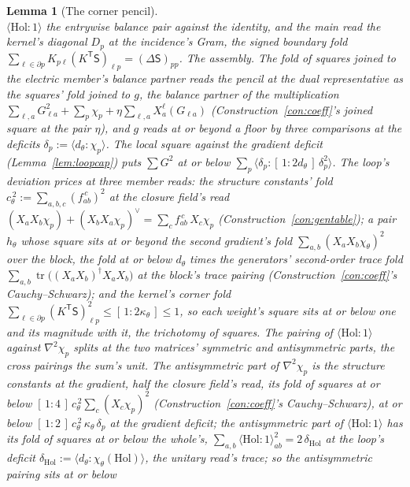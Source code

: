 \documentclass[11pt]{article}
\newtheorem{lemma}{Lemma}
\theoremstyle{definition}
\newcommand{\tr}{\operatorname{tr}}
\begin{document}
\begin{lemma}[The corner pencil]
\[\]
$\langle\mathrm{Hol}\!:\!1\rangle$ the entrywise balance pair
against the identity, and the main read the kernel's diagonal $D_p$
at the incidence's Gram, the signed boundary fold
$\sum_{\ell\in\partial p}K_{p\ell}(K^{\mathsf T}\mathsf S)_{\ell p}
=(\Delta\mathsf S)_{pp}$.
\emph{The assembly.} The fold of squares joined to the electric
member's balance partner reads the pencil at the dual
representative as the squares' fold joined to $g$, the
balance partner of the multiplication
$\sum_{\ell,a}G_{\ell a}^{2}+\sum_p\chi_p+\eta\sum_{\ell,a}X_a^{\ell}(G_{\ell a})$
(Construction~\ref{con:coeff}'s joined square at the pair $\eta$),
and $g$ reads at or beyond a floor by three comparisons at the
deficits $\delta_p:=\langle d_\theta\!:\!\chi_p\rangle$. The local
square against the gradient deficit (Lemma~\ref{lem:loopcap}) puts
$\sum G^{2}$ at or below
$\sum_p\big\langle\delta_p\!:\![\,1:2d_\theta\,]\,\delta_p^{2}\big\rangle$.
The loop's deviation prices at three member reads: the structure
constants' fold $c_\theta^{\,2}:=\sum_{a,b,c}(f_{ab}^{\,c})^{2}$ at
the closure field's read
$(X_aX_b\chi_p)+(X_bX_a\chi_p)^{\!\vee}=\sum_cf_{ab}^{\,c}\,X_c\chi_p$
(Construction~\ref{con:gentable}); a pair $h_\theta$ whose square
sits at or beyond the second gradient's fold
$\sum_{a,b}(X_aX_b\chi_\theta)^{2}$ over the block, the fold at or
below $d_\theta$ times the generators' second-order trace fold
$\sum_{a,b}\tr\big((X_aX_b)^{\dagger}X_aX_b\big)$ at the block's
trace pairing (Construction~\ref{con:coeff}'s Cauchy--Schwarz); and
the kernel's corner fold
$\sum_{\ell\in\partial p}(K^{\mathsf T}\mathsf S)_{\ell p}^{2}
\le[\,1:2\kappa_\theta\,]\le1$, so each weight's square sits at or
below one and its magnitude with it, the trichotomy of squares. The
pairing of $\langle\mathrm{Hol}\!:\!1\rangle$ against
$\nabla^{2}\chi_p$ splits at the two matrices' symmetric and
antisymmetric parts, the cross pairings the sum's unit. The
antisymmetric part of $\nabla^{2}\chi_p$ is the structure constants
at the gradient, half the closure field's read, its fold of squares
at or below $[\,1:4\,]\,c_\theta^{\,2}\sum_c(X_c\chi_p)^{2}$
(Construction~\ref{con:coeff}'s Cauchy--Schwarz), at or below
$[\,1:2\,]\,c_\theta^{\,2}\,\kappa_\theta\,\delta_p$ at the gradient
deficit; the antisymmetric part of $\langle\mathrm{Hol}\!:\!1\rangle$
has its fold of squares at or below the whole's,
$\sum_{a,b}\langle\mathrm{Hol}\!:\!1\rangle_{ab}^{2}=2\,\delta_{\mathrm{Hol}}$
at the loop's deficit $\delta_{\mathrm{Hol}}:=\langle
d_\theta\!:\!\chi_\theta(\mathrm{Hol})\rangle$, the unitary read's
trace; so the antisymmetric pairing sits at or below

\end{lemma}
\end{document}
